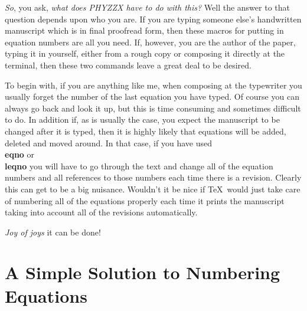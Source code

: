 {\it So}, you ask, {\it what does PHYZZX have to do with this?}
Well the answer to that question depends upon who you are.
If you are typing someone else's handwritten manuscript which is
in final proofread form, then these macros for putting in
equation numbers are all you need.
If, however, you are the author of the paper, typing it in yourself,
either from a rough copy or composing it directly at the
terminal, then these two commands leave a great deal to be desired.
 
To begin with, if you are anything like me, when composing
at the typewriter you usually forget the number of the last
equation you have typed.
Of course you can always go back and look it up, but this is time
consuming and sometimes difficult to do.
In addition if, as is usually the case, you expect the manuscript
to be changed after it is typed, then it is highly likely
that equations will be added, deleted and moved around.
In that case, if you have used {\bf \\eqno} or {\bf \\leqno}
you will have to go through the text and change all of the
equation numbers and all references to those numbers each time
there is a revision.
Clearly this can get to be a big nuisance.
Wouldn't it be nice if \TeX\ would just take care of numbering
all of the equations properly each time it prints the manuscript
taking into account all of the revisions automatically.\hbreak
\centerline{{\it Joy of joys} it can be done!}
 
\section{A Simple Solution to Numbering Equations}
 
